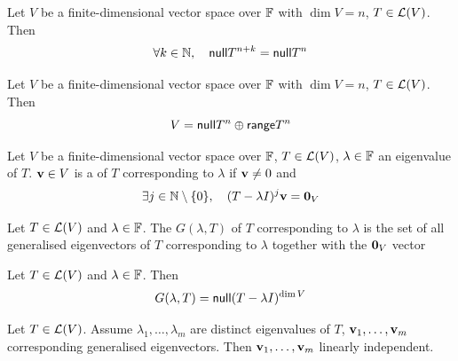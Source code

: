 \documentclass[aspectratio=169]{beamer}
\begin{document}
\begin{frame}
\begin{theorem}
Let $V$ be a finite-dimensional vector space over $\mathbb{F}$ with $\dim V=n$, $T\in\mathcal{L}(V)$. Then 
\[
\forall k\in\mathbb{N},\quad \mathsf{null} T^{n+k}=\mathsf{null} T^n
\]
\end{theorem}
\vfill
\begin{importanttheorem}[$V=\nullspace T^{\dim V}\oplus\range T^{\dim V}$]
Let $V$ be a finite-dimensional vector space over $\mathbb{F}$ with $\dim V=n$, $T\in\mathcal{L}(V)$. Then
\[
V=\mathsf{null} T^n\oplus \mathsf{range} T^n
\]
\end{importanttheorem}
\end{frame}


\begin{frame}
\begin{definition}
Let $V$ be a finite-dimensional vector space over $\mathbb{F}$, $T\in\mathcal{L}(V)$, $\lambda\in\mathbb{F}$ an eigenvalue of $T$. $\mathbf{v}\in V$ is a  of $T$ corresponding to $\lambda$ if $\mathbf{v}\neq 0$ and
\[
\exists j\in\IN\setminus\{0\},\quad
(T-\lambda I)^j\bv=\b0_V
\]
\end{definition}

\begin{definition}
Let $T\in\mathcal{L}(V)$ and $\lambda\in\mathbb{F}$. The  $G(\lambda,T)$ of $T$ corresponding to $\lambda$ is the set of all generalised eigenvectors of $T$ corresponding to $\lambda$ together with the $\b0_V$ vector
\end{definition}
\end{frame}


\begin{frame}
\begin{importanttheorem}
Let $T\in\mathcal{L}(V)$ and $\lambda\in\mathbb{F}$. Then
\[
G(\lambda,T)=\mathsf{null}(T-\lambda I)^{\dim V}
\]
\end{importanttheorem}
\vfill
\begin{theorem}
Let $T\in\mathcal{L}(V)$. Assume $\lambda_1,\ldots,\lambda_m$ are distinct eigenvalues of $T$, $\mathbf{v}_1,\ldots,\mathbf{v}_m$ corresponding generalised eigenvectors. Then $\mathbf{v}_1,\ldots,\mathbf{v}_m$ linearly independent.
\end{theorem}
\end{frame}
\end{document}
